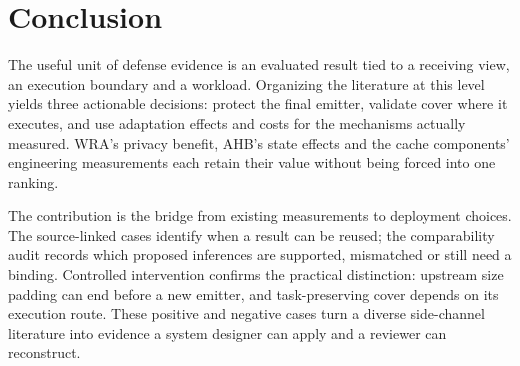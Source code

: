\section{Conclusion}\label{sec:conclusion}
The useful unit of defense evidence is an evaluated result tied to a receiving view, an execution boundary and a workload. Organizing the literature at this level yields three actionable decisions: protect the final emitter, validate cover where it executes, and use adaptation effects and costs for the mechanisms actually measured. WRA's privacy benefit, AHB's state effects and the cache components' engineering measurements each retain their value without being forced into one ranking.

The contribution is the bridge from existing measurements to deployment choices. The source-linked cases identify when a result can be reused; the comparability audit records which proposed inferences are supported, mismatched or still need a binding. Controlled intervention confirms the practical distinction: upstream size padding can end before a new emitter, and task-preserving cover depends on its execution route. These positive and negative cases turn a diverse side-channel literature into evidence a system designer can apply and a reviewer can reconstruct.
